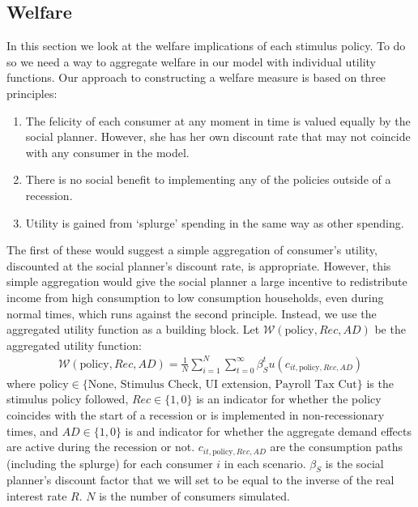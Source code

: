 \documentclass[../HAFiscal]{subfiles}
\begin{document}
\subsection{Welfare}
\label{sec:welfare}

In this section we look at the welfare implications of each stimulus policy. To do so we need a way to aggregate welfare in our model with individual utility functions. Our approach to constructing a welfare measure is based on three principles:
\begin{enumerate}
	\item The felicity of each consumer at any moment in time is valued equally by the social planner.  However, she has her own discount rate that may not coincide with any consumer in the model.
	\item There is no social benefit to implementing any of the policies outside of a recession. 
	\item Utility is gained from `splurge' spending in the same way as other spending.
\end{enumerate} 

The first of these would suggest a simple aggregation of consumer's utility, discounted at the social planner's discount rate, is appropriate. However, this simple aggregation would give the social planner a large incentive to redistribute income from high consumption to low consumption households, even during normal times, which runs against the second principle. Instead, we use the aggregated utility function as a building block. Let  $\mathcal{W}(\text{policy},Rec,AD)$ be the aggregated utility function:
\begin{align}
	\mathcal{W}(\text{policy},Rec,AD) =\frac{1}{N}\sum_{i=1}^{N} \sum_{t=0}^{\infty} \beta_S^t u(c_{it,\text{policy},Rec,AD}) 
\end{align}
where $\text{policy}\in \{\text{None, Stimulus Check, UI extension, Payroll Tax Cut}\}$ is the stimulus policy followed, $Rec\in\{1,0\}$ is an indicator for whether the policy coincides with the start of a recession or is implemented in non-recessionary times, and $AD\in\{1,0\}$ is and indicator for whether the aggregate demand effects are active during the recession or not. $c_{it,\text{policy},Rec,AD}$ are the consumption paths (including the splurge) for each consumer $i$ in each scenario. $\beta_S$ is the social planner's discount factor that we will set to be equal to the inverse of the real interest rate $R$. $N$ is the number of consumers simulated.
\end{document}
